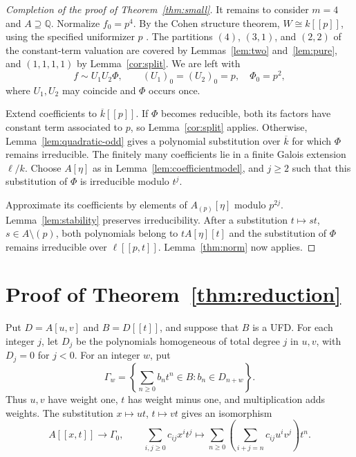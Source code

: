 \documentclass[11pt]{amsart}
\theoremstyle{remark}
\newcommand{\Q}{\mathbb Q}
\begin{document}
\begin{proof}[Completion of the proof of Theorem~\ref{thm:small}]
It remains to consider $m=4$ and $A\supseteq\Q$. Normalize
$f_0=p^4$. By the Cohen structure theorem,
$W\cong k[[p]]$, using the specified uniformizer $p$
\cite[Tag 0323]{Stacks}. The partitions $(4)$, $(3,1)$, and
$(2,2)$ of the constant-term valuation are covered by
Lemmas~\ref{lem:two} and~\ref{lem:pure}, and $(1,1,1,1)$ by
Lemma~\ref{cor:split}. We are left with
\[
 f\sim U_1U_2\Phi,\qquad (U_1)_0=(U_2)_0=p,\quad\Phi_0=p^2,
\]
where $U_1,U_2$ may coincide and $\Phi$ occurs once.

Extend coefficients to $\overline{k}[[p]]$. If $\Phi$ becomes
reducible, both its factors have constant term associated to $p$,
so Lemma~\ref{cor:split} applies. Otherwise,
Lemma~\ref{lem:quadratic-odd} gives a polynomial substitution over
$\overline{k}$ for which $\Phi$ remains irreducible. The finitely
many coefficients lie in a finite Galois extension $\ell/k$.
Choose $A[\eta]$ as in Lemma~\ref{lem:coefficientmodel}, and
$j\geq2$ such that this substitution of $\Phi$ is irreducible
modulo $t^j$.

Approximate its coefficients by elements of $A_{(p)}[\eta]$
modulo $p^{2j}$. Lemma~\ref{lem:stability} preserves
irreducibility. After a substitution $t\mapsto st$,
$s\in A\setminus(p)$, both polynomials belong to
$tA[\eta][t]$ and the substitution of $\Phi$ remains irreducible
over $\ell[[p,t]]$. Lemma~\ref{thm:norm} now applies.
\end{proof}


\section{Proof of Theorem~\ref{thm:reduction}}
\label{sec:reduction}

Put $D=A[u,v]$ and $B=D[[t]]$, and suppose that $B$ is a UFD.
For each integer $j$, let $D_j$ be the polynomials homogeneous
of total degree $j$ in $u,v$, with $D_j=0$ for $j<0$. For an
integer $w$, put
\[
 \Gamma_w=\left\{\sum_{n\geq0}b_nt^n\in B:
                          b_n\in D_{n+w}\right\}.
\]
Thus $u,v$ have weight one, $t$ has weight minus one, and
multiplication adds weights. The substitution $x\mapsto ut$,
$t\mapsto vt$ gives an isomorphism
\begin{equation}\label{red:eq:embedding}
 A[[x,t]]\longrightarrow\Gamma_0,\qquad
 \sum_{i,j\geq0}c_{ij}x^it^j\longmapsto
 \sum_{n\geq0}\left(\sum_{i+j=n}c_{ij}u^iv^j\right)t^n.
\end{equation}
\end{document}

